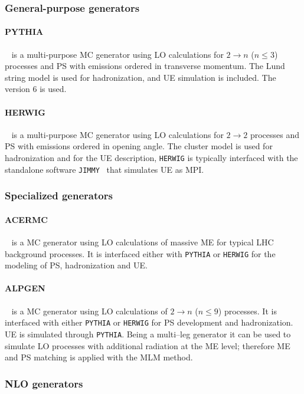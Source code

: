 \subsubsection*{General-purpose generators}

\paragraph{PYTHIA}~\cite{pythia6} is a multi-purpose MC
generator using LO calculations for $2 \to n$ ($n\leq 3$) processes
and PS with emissions ordered in transverse momentum. 
The Lund string model is used for hadronization, and UE simulation is
included. The \pythia{} version 6 is used.

\paragraph{HERWIG}~\cite{herwig} is a multi-purpose MC generator using LO
calculations for $2 \to 2$ processes and PS with emissions ordered in
opening angle. 
The cluster model is used for hadronization and for the UE
description, \texttt{HERWIG} is typically interfaced with the
standalone software \texttt{JIMMY}~\cite{jimmy} that simulates UE as MPI.

\subsubsection*{Specialized generators}

\paragraph{ACERMC}~\cite{acermc} is a MC generator using LO
calculations of massive ME for typical LHC background processes. It is
interfaced either with \texttt{PYTHIA} or \texttt{HERWIG} for the
modeling of PS, hadronization and UE.

\paragraph{ALPGEN}~\cite{alpgen} is a MC generator using LO calculations
of $2 \to n$ ($n\leq 9$) processes. It is interfaced with either
\texttt{PYTHIA} or \texttt{HERWIG} for PS development and
hadronization. UE is simulated through \texttt{PYTHIA}. Being a
multi--leg generator it can be used to simulate LO processes with
additional radiation at the ME level; therefore ME and PS matching is
applied with the MLM method.

\subsubsection*{NLO generators}

